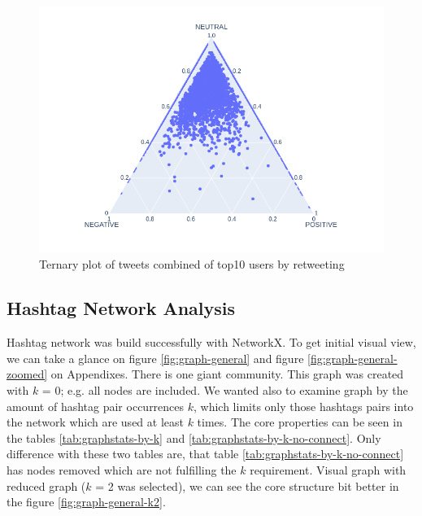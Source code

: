 \documentclass[conference]{IEEEtran}
\begin{document}
    \begin{figure}
        \includegraphics[scale=0.4]{figures/sentiment_ternary_all}
        \caption{Ternary plot of tweets combined of top10 users by retweeting }
        \label{fig:sentiment-ternary-user-retweet}
    \end{figure}

    \subsection{Hashtag Network Analysis}

    Hashtag network was build successfully with NetworkX.
    To get initial visual view, we can take a glance on figure \ref{fig:graph-general} and figure \ref{fig:graph-general-zoomed} on Appendixes.
    There is one giant community.
    This graph was created with $k$ = 0; e.g. all nodes are included.
    We wanted also to examine graph by the amount of hashtag pair occurrences $k$, which limits only those hashtags pairs into the network
    which are used at least $k$ times.
    The core properties can be seen in the tables \ref{tab:graphstats-by-k} and \ref{tab:graphstats-by-k-no-connect}.
    Only difference with these two tables are, that table \ref{tab:graphstats-by-k-no-connect} has nodes removed which are not
    fulfilling the $k$ requirement.
    Visual graph with reduced graph ($k$ = 2 was selected), we can see the core structure bit better in the figure \ref{fig:graph-general-k2}.
\end{document}
